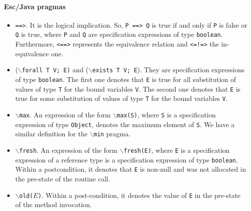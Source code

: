 \documentclass[a4paper]{llncs}
\begin{document}
\paragraph{\sc \bf Esc/Java pragmas}
\begin{itemize}
\item{\texttt{==>}.} It is the logical implication. So, \texttt{P
==> Q} is true if and only if \texttt{P} is false or \texttt{Q} is
true, where \texttt{P} and \texttt{Q} are specification expressions of
type \texttt{boolean}. Furthermore, \texttt{<==>} represents the
equivalence relation and \texttt{<=!=>} the in-equivalence one.

\item {($\backslash$\texttt{forall T V; E)} and
($\backslash$\texttt{exists T V; E}).}
They are specification expressions of type \texttt{boolean}. The first one
denotes that \texttt{E} is true for all substitution of values
of type \texttt{T} for the bound variables \texttt{V}. The second one
denotes that \texttt{E} is true for some substitution of values of
type \texttt{T} for the bound variables \texttt{V}.

\item {$\backslash$\texttt{max}.} An expression of the form
\texttt{$\backslash$max(S)}, where \texttt{S} is a specification
expression of type \texttt{Object}, denotes the maximum element of
\texttt{S}. We have a similar definition for the
$\backslash$\texttt{min} pragma.

\item{\texttt{$\backslash$fresh}.} An expression of the form
\texttt{$\backslash$fresh(E)}, where \texttt{E} is a specification
expression of a reference type is a specification expression of type
\texttt{boolean}. Within a postcondition, it denotes that \texttt{E}
is non-null and was not allocated in the pre-state of the routine
call.

\item{\texttt{$\backslash$old($E$)}.} Within a post-condition, it denotes
the value of \texttt{E} in the pre-state of the method invocation. %



\end{itemize}
\end{document}
